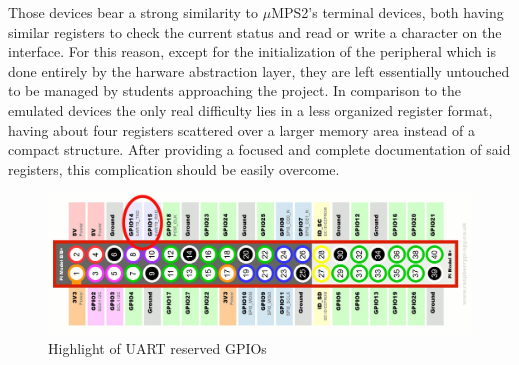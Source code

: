 \documentclass[12pt,a4paper,openright,twoside]{report}
\begin{document}
Those devices bear a strong similarity to $\mu$MPS2's terminal devices, both having 
similar registers to check the current status and read or write a character on the
interface. For this reason, except for the initialization of the peripheral
which is done entirely by the harware abstraction layer, they are left essentially
 untouched to be managed by students approaching the project. In comparison to 
 the emulated devices the only real difficulty lies in a less organized register
 format, having about four registers scattered over a larger memory area instead
 of a compact structure. After providing a focused and complete documentation of 
 said registers, this complication should be easily overcome.

 \begin{figure}[t]
 \includegraphics[scale=0.143]{images/tesi2.jpg}
 \caption[Raspberry Pi UART pins]{Highlight of UART reserved GPIOs}\label{fig:seconda}
 \end{figure}
\end{document}
